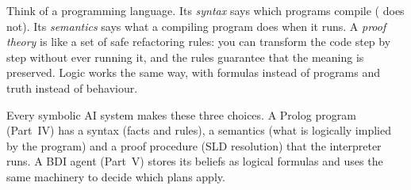 \begin{nbintuition}
Think of a programming language. Its \emph{syntax} says which programs compile
( does not). Its \emph{semantics} says what a compiling program does when it
runs. A \emph{proof theory} is like a set of safe refactoring rules: you can transform the
code step by step without ever running it, and the rules guarantee that the meaning is
preserved. Logic works the same way, with formulas instead of programs and truth instead
of behaviour.
\end{nbintuition}

\begin{nbwhy}
Every symbolic AI system makes these three choices. A Prolog program (Part~IV) has a syntax
(facts and rules), a semantics (what is logically implied by the program) and a proof
procedure (SLD resolution) that the interpreter runs. A BDI agent (Part~V) stores its
beliefs as logical formulas and uses the same machinery to decide which plans apply.
\end{nbwhy}

